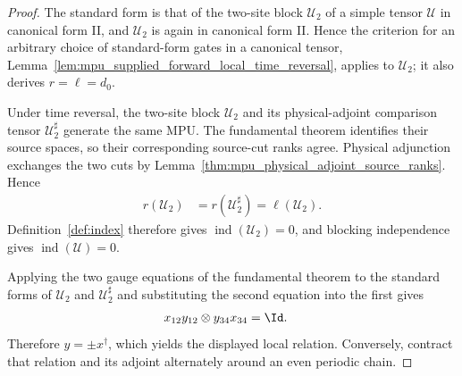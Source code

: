 \begin{proof}\leanok
    The standard form is that of the two-site block $\mathcal U_2$ of a
    simple tensor $\mathcal U$ in canonical form II, and $\mathcal U_2$ is
    again in canonical form II. Hence the criterion for an arbitrary choice of
    standard-form gates in a canonical tensor,
    Lemma~\ref{lem:mpu_supplied_forward_local_time_reversal}, applies to
    $\mathcal U_2$; it also derives $r=\ell=d_0$.

    Under time reversal, the two-site block $\mathcal U_2$ and its
    physical-adjoint comparison tensor $\mathcal U_2^\sharp$ generate the
    same MPU. The fundamental theorem identifies their source spaces,
    so their corresponding source-cut ranks agree. Physical adjunction exchanges
    the two cuts by Lemma~\ref{thm:mpu_physical_adjoint_source_ranks}. Hence
    \begin{align}
        r(\mathcal U_2)
         & =r(\mathcal U_2^\sharp)
        =\ell(\mathcal U_2).
    \end{align}
    Definition~\ref{def:index} therefore gives
    $\operatorname{ind}(\mathcal U_2)=0$, and blocking independence gives
    $\operatorname{ind}(\mathcal U)=0$.

    Applying the two gauge equations of the fundamental theorem to the standard
    forms of $\mathcal U_2$ and $\mathcal U_2^\sharp$ and substituting the second
    equation into the first gives
    \begin{align}
        x_{12}y_{12}\otimes y_{34}x_{34} & =\Id.
    \end{align}
    Therefore $y=\pm x^\dagger$, which yields the displayed local relation.
    Conversely, contract that relation and its adjoint alternately around an
    even periodic chain.
\end{proof}

